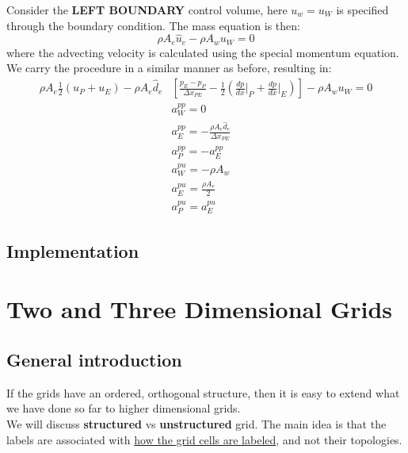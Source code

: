 \documentclass[11pt]{article}
\begin{document}
Consider the \textbf{LEFT BOUNDARY} control volume, here \(u_w = u_W\) is specified through the boundary condition. The
mass equation is then:
\begin{equation*}
\rho A_e \hat{u}_e - \rho A_w u_W = 0
\end{equation*}
where the advecting velocity is calculated using the special momentum equation. We carry the procedure in a
similar manner as before, resulting in:
\begin{equation*}
\begin{aligned}
\rho A_e \frac{1}{2}(u_P+u_E) - \rho A_e \hat{d}_e &\left[\frac{p_E-p_P}{\Delta x_{PE}}
-\frac{1}{2} \left( \frac{dp}{dx}\biggr\rvert_P + \frac{dp}{dx}\biggr\rvert_E \right) \right]
-\rho A_w u_W = 0\\
&a_W^{pp} = 0\\
&a_E^{pp} = -\frac{\rho A_e \hat{d}_e}{\Delta x_{PE}}\\
&a_P^{pp} = -a_E^{pp}\\
&a_W^{pu} = -\rho A_w\\
&a_E^{pu} = \frac{\rho A_e}{2}\\
&a_P^{pu} = a_E^{pu}
\end{aligned}
\end{equation*}
\subsection{Implementation}
\label{sec:orgb024e08}

\newpage
\section{Two and Three Dimensional Grids}
\label{sec:orgb607208}
\subsection{General introduction}
\label{sec:orge42f159}
If the grids have an ordered, orthogonal structure, then it is easy to extend what we have done so
far to higher dimensional grids. \\
We will discuss \textbf{structured} vs \textbf{unstructured} grid. The main idea is
that the labels are associated with \uline{how the grid cells are labeled}, and not their topologies.
\end{document}
